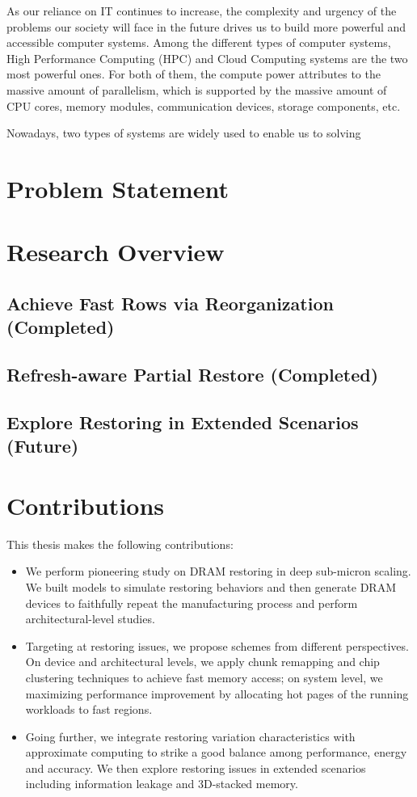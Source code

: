 As our reliance on IT continues to increase, the complexity and urgency of the problems our society will face in the future drives us to build more powerful and accessible computer systems. Among the different types of computer systems, High Performance Computing (HPC) and Cloud Computing systems are the two most powerful ones. For both of them, the compute power attributes to the massive amount of parallelism, which is supported by the massive amount of CPU cores, memory modules, communication devices, storage components, etc. 

Nowadays, two types of systems are widely used to enable us to solving 



\section{Problem Statement}

\section{Research Overview}

\subsection{Achieve Fast Rows via Reorganization (Completed)}

\subsection{Refresh-aware Partial Restore (Completed)}

\subsection{Explore Restoring in Extended Scenarios (Future)}


\section{Contributions}
This thesis makes the following contributions:

\begin{itemize}
\item We perform pioneering study on DRAM restoring in deep sub-micron scaling. We built models to simulate restoring behaviors and then generate DRAM devices to faithfully repeat the manufacturing process  and perform architectural-level studies.
\item Targeting at restoring issues, we propose schemes from different perspectives. On device and architectural levels, we apply chunk remapping and chip clustering techniques to achieve fast memory access; on system level, we maximizing performance improvement by allocating hot pages of the running workloads to fast regions.
\item Going further, we integrate restoring variation characteristics with approximate computing to strike a good balance among performance, energy and accuracy. We then explore restoring issues in extended scenarios including information leakage and 3D-stacked memory.  
\end{itemize}


